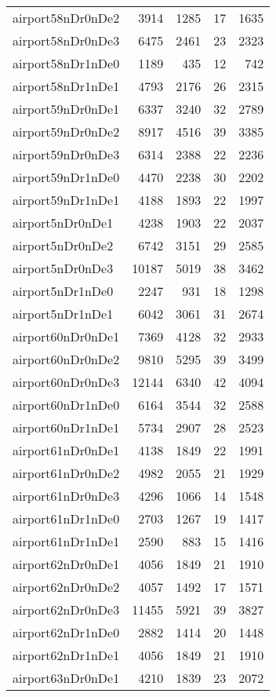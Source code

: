 \documentclass[../../../thesis.tex]{subfiles}
\begin{document}
\begin{longtable}{lrrrr}
airport58nDr0nDe2 & 3914 & 1285 & 17 & 1635 \\
airport58nDr0nDe3 & 6475 & 2461 & 23 & 2323 \\
airport58nDr1nDe0 & 1189 & 435 & 12 & 742 \\
airport58nDr1nDe1 & 4793 & 2176 & 26 & 2315 \\
airport59nDr0nDe1 & 6337 & 3240 & 32 & 2789 \\
airport59nDr0nDe2 & 8917 & 4516 & 39 & 3385 \\
airport59nDr0nDe3 & 6314 & 2388 & 22 & 2236 \\
airport59nDr1nDe0 & 4470 & 2238 & 30 & 2202 \\
airport59nDr1nDe1 & 4188 & 1893 & 22 & 1997 \\
airport5nDr0nDe1 & 4238 & 1903 & 22 & 2037 \\
airport5nDr0nDe2 & 6742 & 3151 & 29 & 2585 \\
airport5nDr0nDe3 & 10187 & 5019 & 38 & 3462 \\
airport5nDr1nDe0 & 2247 & 931 & 18 & 1298 \\
airport5nDr1nDe1 & 6042 & 3061 & 31 & 2674 \\
airport60nDr0nDe1 & 7369 & 4128 & 32 & 2933 \\
airport60nDr0nDe2 & 9810 & 5295 & 39 & 3499 \\
airport60nDr0nDe3 & 12144 & 6340 & 42 & 4094 \\
airport60nDr1nDe0 & 6164 & 3544 & 32 & 2588 \\
airport60nDr1nDe1 & 5734 & 2907 & 28 & 2523 \\
airport61nDr0nDe1 & 4138 & 1849 & 22 & 1991 \\
airport61nDr0nDe2 & 4982 & 2055 & 21 & 1929 \\
airport61nDr0nDe3 & 4296 & 1066 & 14 & 1548 \\
airport61nDr1nDe0 & 2703 & 1267 & 19 & 1417 \\
airport61nDr1nDe1 & 2590 & 883 & 15 & 1416 \\
airport62nDr0nDe1 & 4056 & 1849 & 21 & 1910 \\
airport62nDr0nDe2 & 4057 & 1492 & 17 & 1571 \\
airport62nDr0nDe3 & 11455 & 5921 & 39 & 3827 \\
airport62nDr1nDe0 & 2882 & 1414 & 20 & 1448 \\
airport62nDr1nDe1 & 4056 & 1849 & 21 & 1910 \\
airport63nDr0nDe1 & 4210 & 1839 & 23 & 2072 \\

\end{longtable}
\end{document}
